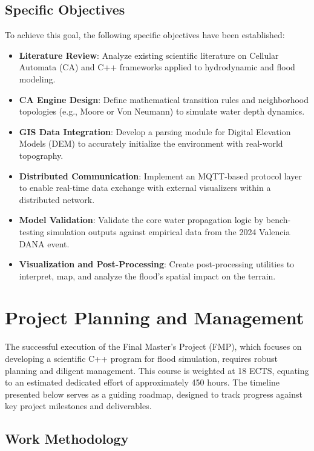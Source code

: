\subsection{Specific Objectives}

To achieve this goal, the following specific objectives have been established:

\begin{itemize}
    \item \textbf{Literature Review}: Analyze existing scientific literature on Cellular Automata (CA) and C++ frameworks applied to hydrodynamic and flood modeling.
    \item \textbf{CA Engine Design}: Define mathematical transition rules and neighborhood topologies (e.g., Moore or Von Neumann) to simulate water depth dynamics.
    \item \textbf{GIS Data Integration}: Develop a parsing module for Digital Elevation Models (DEM) to accurately initialize the environment with real-world topography.
    \item \textbf{Distributed Communication}: Implement an MQTT-based protocol layer to enable real-time data exchange with external visualizers within a distributed network.
    \item \textbf{Model Validation}: Validate the core water propagation logic by bench-testing simulation outputs against empirical data from the 2024 Valencia DANA event.
    \item \textbf{Visualization and Post-Processing}: Create post-processing utilities to interpret, map, and analyze the flood's spatial impact on the terrain.
\end{itemize}


\section{Project Planning and Management}
\label{sec:project_planning_and_management}

The successful execution of the Final Master's Project (FMP), which focuses on developing a scientific C++ program for flood simulation, 
requires robust planning and diligent management. This course is weighted at 18 ECTS, equating to an estimated dedicated effort of 
approximately 450 hours. The timeline presented below serves as a guiding roadmap, designed to track progress against key project 
milestones and deliverables.

\subsection{Work Methodology}
\label{subsec:methodology}

